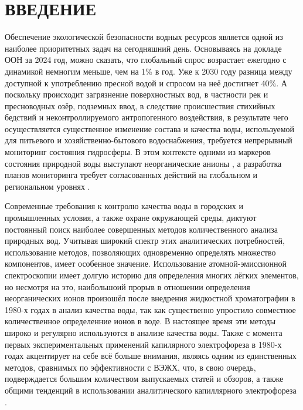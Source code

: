 \chapter*{ВВЕДЕНИЕ}

Обеспечение экологической безопасности водных ресурсов является одной из наиболее приоритетных задач на сегодняшний день. Основываясь на докладе ООН за 2024 год, можно сказать, что глобальный спрос возрастает ежегодно с динамикой немногим меньше, чем на 1\% в год. Уже к 2030 году разница между доступной к употреблению пресной водой и спросом на неё достигнет 40\%. А поскольку происходит загрязнение поверхностных вод, в частности рек и пресноводных озёр, подземных ввод, в следствие происшествия стихийных бедствий и неконтроллируемого антропогенного воздействия, в результате чего осуществляется существенное изменение состава и качества воды, используемой для питьевого и хозяйственно-бытового водоснабжения, требуется непрерывный мониторинг состояния гидросферы. В этом контексте одними из маркеров состояния природной воды выступают неорганические анионы \cite{unwaterWaterProsperityPeace2024}, а разработка планов мониторинга требует согласованных действий на глобальном и региональном уровнях \cite{kellyNOAAOceanicAtmospheric2025}.

Современные требования к контролю качества воды в городских и промышленных условия, а также охране окружающей среды, диктуют постоянный поиск наиболее совершенных методов количественного анализа природных вод. Учитывая широкий спектр этих аналитических потребностей, использование методов, позволяющих одновременно определять множество компонентов, имеет особенное значение. Использование атомной-эмиссионной спектроскопии имеет долгую историю для определения многих лёгких элементов, но несмотря на это, наибольшоий прорыв в отношении определения неорганических ионов произошёл после внедрения жидкостной хроматографии в 1980-х годах в анализ качества воды, так как существенно упростило совместное количественное определенние ионов в воде. В настоящее время эти методы широко и регулярно используются в анализе качества воды. Также с момента первых экспериментальных применений капилярного электрофореза в 1980-х годах акцентирует на себе всё больше внимания, являясь одним из единственных методов, сравнимых по эффективности с ВЭЖХ, что, в свою очередь, подверждается большим количеством выпускаемых статей и обзоров, а также общими тенденций в использовании аналитического капиллярного электрофореза \cite{pobozyApplicationCapillaryElectrophoresis2021b}.


